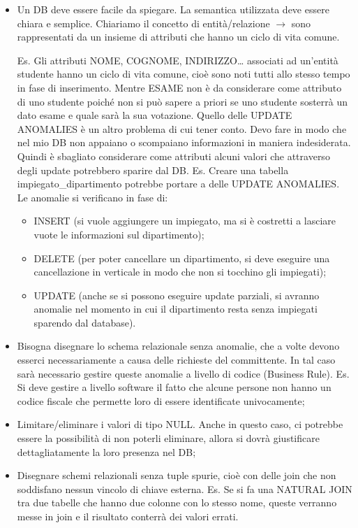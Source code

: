 \begin{itemize}

\item Un DB deve essere facile da spiegare. La semantica utilizzata deve essere chiara e semplice.  
Chiariamo il concetto di entità/relazione $\rightarrow$ sono rappresentati da un insieme di attributi che hanno un ciclo di vita comune. 

Es. Gli attributi NOME, COGNOME, INDIRIZZO… associati ad un’entità studente hanno un ciclo di vita comune, cioè sono noti tutti allo stesso tempo in fase di inserimento. Mentre ESAME non è da considerare come attributo di uno studente poiché non si può sapere a priori se uno studente sosterrà un dato esame e quale sarà la sua votazione.  
Quello delle UPDATE ANOMALIES è un altro problema di cui tener conto. Devo fare in modo che nel mio DB non appaiano o scompaiano informazioni in maniera indesiderata. Quindi è sbagliato considerare come attributi alcuni valori che attraverso degli update potrebbero sparire dal DB.  
Es. Creare una tabella impiegato\_dipartimento potrebbe portare a delle UPDATE ANOMALIES. Le anomalie si verificano in fase di: 

\begin{itemize}

\item INSERT (si vuole aggiungere un impiegato, ma si è costretti a lasciare vuote le informazioni sul dipartimento);   
\item DELETE (per poter cancellare un dipartimento, si deve eseguire una cancellazione in verticale in modo che non si tocchino gli impiegati);   
\item UPDATE (anche se si possono eseguire update parziali, si avranno anomalie nel momento in cui il dipartimento resta senza impiegati sparendo dal database). 

\end{itemize}

\item Bisogna disegnare lo schema relazionale senza anomalie, che a volte devono esserci necessariamente a causa delle richieste del committente. 
In tal caso sarà necessario gestire queste anomalie a livello di codice (Business Rule). Es. Si deve gestire a livello software il fatto che alcune persone non hanno un codice fiscale che permette loro di essere identificate univocamente;

\item  Limitare/eliminare i valori di tipo NULL. Anche in questo caso, ci potrebbe essere la possibilità di non poterli eliminare, allora si dovrà giustificare dettagliatamente la loro presenza nel DB;

\item Disegnare schemi relazionali senza tuple spurie, cioè con delle join che non soddisfano nessun vincolo di chiave esterna. 
 Es. Se si fa una NATURAL JOIN tra due tabelle che hanno due colonne con lo stesso nome, queste verranno messe in join e il risultato conterrà dei valori errati.  
 
\end{itemize}


